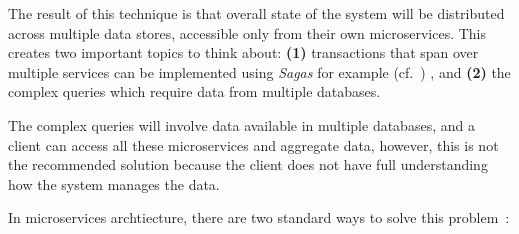 The result of this technique is that overall state of the system will be distributed across multiple data stores, accessible only from their own microservices. This creates two important topics to think about: \textbf{(1)} transactions that span over multiple services can be implemented using \emph{Sagas} for example (cf.~\pageref{sec:sagas})
, and \textbf{(2)} the complex queries which require data from multiple databases.

The complex queries will involve data available in multiple databases, and a client can access all these microservices and aggregate data, however, this is not the recommended solution because the client does not have full understanding how the system manages the data.

In microservices archtiecture, there are two standard ways to solve this problem~\cite{richardson2018microservices}:

